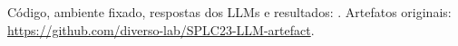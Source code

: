 Código, ambiente fixado, respostas dos LLMs e resultados: . Artefatos originais: \url{https://github.com/diverso-lab/SPLC23-LLM-artefact}.
